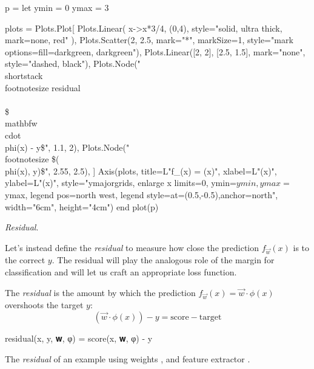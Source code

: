 \begin{marginfigure}[10mm]
  \begin{jlcode}
    p = let
        ymin = 0
        ymax = 3

        plots = Plots.Plot[
            Plots.Linear(
                x->x*3/4, (0,4), style="solid, ultra thick, mark=none, red"
            ),
            Plots.Scatter(2, 2.5, mark="*", markSize=1, style="mark options={fill=darkgreen}, darkgreen"),
            Plots.Linear([2, 2], [2.5, 1.5], mark="none", style="dashed, black"),
            Plots.Node("\\shortstack{\\footnotesize residual\\\\\$\\mathbf{w}\\cdot\\phi(x) - y\$}", 1.1, 2),
            Plots.Node("\\footnotesize \$(\\phi(x), y)\$", 2.55, 2.5),
        ]
        Axis(plots,
             title=L"f_{}(x) = \cdot\phi(x)",
             xlabel=L"\phi(x)",
             ylabel=L"\cdot\phi(x)",
             style="ymajorgrids, enlarge x limits=0, ymin=$ymin, ymax=$ymax, legend pos=north west, legend style={at={(0.5,-0.5)},anchor=north}",
             width="6cm", height="4cm")
    end
    plot(p)
  \end{jlcode}
  \begin{center}
  \end{center}

\caption{
\label{fig:residual} \textit{Residual}.
}
\end{marginfigure}
Let's instead define the \textit{residual} to measure how close the prediction $f_{\vec{w}}(x)$ is to the correct $y$.
The residual will play the analogous role of the margin for classification and will let us craft an appropriate loss function.
\begin{example}
     The \textit{residual} is the amount by which the prediction $f_{\vec{w}}(x)=\vec{w} \cdot \phi(x)$ overshoots the target $y$:
    \[
        (\vec{w} \cdot \phi(x)) - y = \text{score} - \text{target}
    \]
\end{example}

\begin{algorithm}
\begin{juliaverbatim}
residual(x, y, 𝐰, φ) = score(x, 𝐰, φ) - y
\end{juliaverbatim}

\caption{
    \label{alg:residual}
    The \textit{residual} of an example  using weights , and feature extractor .
}
\end{algorithm}

